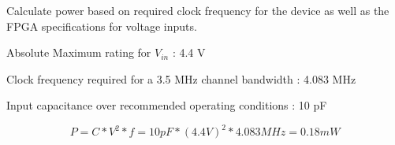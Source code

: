\documentclass[dvips,10pt,twocolumn]{article}
\begin{document}
  Calculate power based on required clock frequency for the device as well as the
  FPGA specifications for voltage inputs.
  
  Absolute Maximum rating for $V_{in}$ : 4.4 V
  
  Clock frequency required for a 3.5 MHz channel bandwidth : 4.083 MHz
  
  Input capacitance over recommended operating conditions : 10 pF
  \begin{center}
  \begin{equation}
  P = C * V^2 * f = 10 pF * (4.4 V)^2 * 4.083 MHz = 0.18 mW
  \end{equation}
  \end{center}
  

{}

\end{document}
